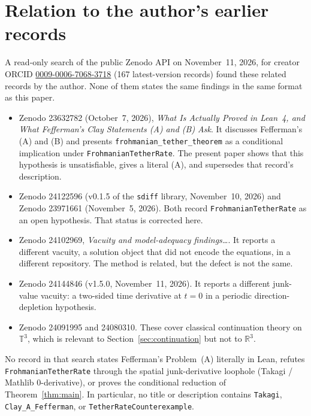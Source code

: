 \documentclass[11pt,a4paper]{article}
\theoremstyle{definition}
\theoremstyle{remark}
\newcommand{\R}{\mathbb{R}}
\newcommand{\T}{\mathbb{T}}
\newcommand{\lean}[1]{\texttt{#1}}
\begin{document}
\section{Relation to the author's earlier records}\label{sec:prior}

A read-only search of the public Zenodo API on November~11, 2026, for creator ORCID \href{https://orcid.org/0009-0006-7068-3718}{0009-0006-7068-3718} (167 latest-version records) found these related records by the author. None of them states the same findings in the same format as this paper.
\begin{itemize}
\item Zenodo 23632782 (October~7, 2026), \emph{What Is Actually Proved in Lean~4, and What Fefferman's Clay Statements (A) and (B) Ask}. It discusses Fefferman's (A) and (B) and presents \lean{frohmanian\_tether\_theorem} as a conditional implication under \lean{FrohmanianTetherRate}. The present paper shows that this hypothesis is unsatisfiable, gives a literal (A), and supersedes that record's description.
\item Zenodo 24122596 (v0.1.5 of the \lean{sdiff} library, November~10, 2026) and Zenodo 23971661 (November~5, 2026). Both record \lean{FrohmanianTetherRate} as an open hypothesis. That status is corrected here.
\item Zenodo 24102969, \emph{Vacuity and model-adequacy findings\ldots}. It reports a different vacuity, a solution object that did not encode the equations, in a different repository. The method is related, but the defect is not the same.
\item Zenodo 24144846 (v1.5.0, November~11, 2026). It reports a different junk-value vacuity: a two-sided time derivative at $t=0$ in a periodic direction-depletion hypothesis.
\item Zenodo 24091995 and 24080310. These cover classical continuation theory on $\T^3$, which is relevant to Section~\ref{sec:continuation} but not to $\R^3$.
\end{itemize}
No record in that search states Fefferman's Problem~(A) literally in Lean, refutes \lean{FrohmanianTetherRate} through the spatial junk-derivative loophole (Takagi / Mathlib $0$-derivative), or proves the conditional reduction of Theorem~\ref{thm:main}. In particular, no title or description contains \lean{Takagi}, \lean{Clay\_A\_Fefferman}, or \lean{TetherRateCounterexample}.

\end{document}
